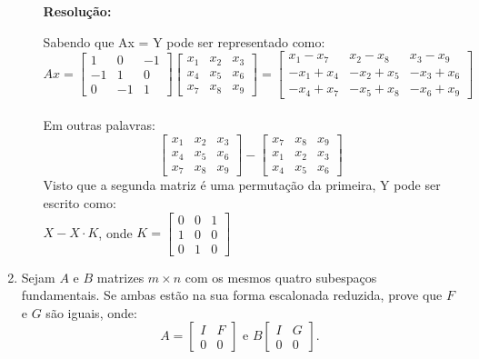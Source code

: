 \documentclass[leqno]{article}
\numberwithin{equation}{section}
\theoremstyle{definition}
\newenvironment{sol}
	{
		\vspace{4mm}
		\noindent\textbf{Resolução:}
		\strut\newline
		\smallskip
		\hspace{-3.5mm}
	}
	{}
\begin{document}
\begin{enumerate}
\begin{enumerate}
			\begin{sol} 
				Sabendo que Ax = Y pode ser representado como:\\
				$$Ax = 
				\begin{bmatrix}
					1 & 0 & -1 \\
					-1 & 1 & 0 \\
					0 & -1 & 1
				\end{bmatrix}
				\begin{bmatrix}
					x_1 & x_2 & x_3 \\
					x_4 & x_5 & x_6 \\
					x_7 & x_8 & x_9
				\end{bmatrix} =
				\begin{bmatrix}
					x_1 - x_7 & x_2 - x_8 & x_3 - x_9 \\
					-x_1 + x_4 & -x_2 + x_5 & -x_3 + x_6 \\
					-x_4 + x_7 & -x_5 + x_8 & -x_6 + x_9
				\end{bmatrix}$$ \\
				Em outras palavras:
				 $$\begin{bmatrix}
				 	x_1 & x_2 & x_3 \\
				 	x_4 & x_5 & x_6 \\
				 	x_7 & x_8 & x_9
				 \end{bmatrix} - 
			 	\begin{bmatrix}
				 x_7 & x_8 & x_9 \\
				 x_1 & x_2 & x_3 \\
				 x_4 & x_5 & x_6
				 \end{bmatrix}$$
			 Visto que a segunda matriz é uma permutação da primeira, Y pode ser escrito como:\\
			 $X - X \cdot K$, onde $K = \begin{bmatrix}
			 	0 & 0 & 1 \\
			 	1 & 0 & 0 \\
			 	0 & 1 & 0
			 \end{bmatrix}$
			\end{sol} 
		\end{enumerate}
		
		\item Sejam $A$ e $B$ matrizes $m \times n$ com os mesmos quatro subespaços fundamentais. Se ambas estão na sua forma escalonada reduzida, prove que $F$ e $G$ são iguais, onde:
		$$A = \begin{bmatrix}
			I & F \\
			0 & 0
		\end{bmatrix} \mbox{ e } B \begin{bmatrix}
			I & G \\
			0 & 0
		\end{bmatrix}.$$
		

\end{enumerate}
\end{document}
